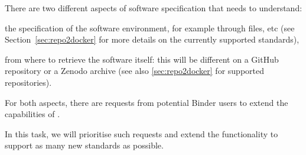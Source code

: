 \begin{task}[
  title=Support more software specification standards,
  id=buildpacks,
  lead=SRL,
  PM=12,
  partners={MP}
  ]

  There are two different aspects of software specification that \repotodocker{}
  needs to understand:
  \begin{compactitem}
  \item the specification of the software environment, for example through
     files, etc (see
    Section~\ref{sec:repo2docker}
    for more details on the currently 
    supported standards),
  \item from where to retrieve the software itself: this will be different on a
    GitHub repository or a Zenodo archive
    (see also \ref{sec:repo2docker} for supported repositories).
  \end{compactitem}

  For both aspects, there are requests from potential Binder users to extend the
  capabilities of \repotodocker{}.

  In this task, we will prioritise such requests and extend the \repotodocker{}
  functionality to support as many new standards as possible.

\end{task}
